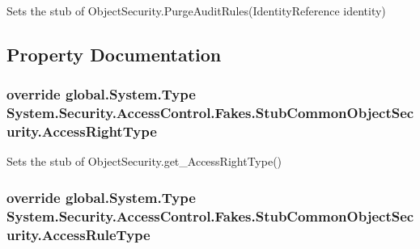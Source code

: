 Sets the stub of Object\-Security.\-Purge\-Audit\-Rules(\-Identity\-Reference identity)



\subsection{Property Documentation}
\hypertarget{class_system_1_1_security_1_1_access_control_1_1_fakes_1_1_stub_common_object_security_ad3e570e6ce7775cc9306b749c837eef1}{
\subsubsection[{Access\-Right\-Type}]{\setlength{\rightskip}{0pt plus 5cm}override global.\-System.\-Type System.\-Security.\-Access\-Control.\-Fakes.\-Stub\-Common\-Object\-Security.\-Access\-Right\-Type\hspace{0.3cm}{\ttfamily [get]}}}\label{class_system_1_1_security_1_1_access_control_1_1_fakes_1_1_stub_common_object_security_ad3e570e6ce7775cc9306b749c837eef1}


Sets the stub of Object\-Security.\-get\-\_\-\-Access\-Right\-Type()

\hypertarget{class_system_1_1_security_1_1_access_control_1_1_fakes_1_1_stub_common_object_security_ab15e453fe4ca5aef26351f1c280f08f4}{
\subsubsection[{Access\-Rule\-Type}]{\setlength{\rightskip}{0pt plus 5cm}override global.\-System.\-Type System.\-Security.\-Access\-Control.\-Fakes.\-Stub\-Common\-Object\-Security.\-Access\-Rule\-Type\hspace{0.3cm}{\ttfamily [get]}}}\label{class_system_1_1_security_1_1_access_control_1_1_fakes_1_1_stub_common_object_security_ab15e453fe4ca5aef26351f1c280f08f4}


